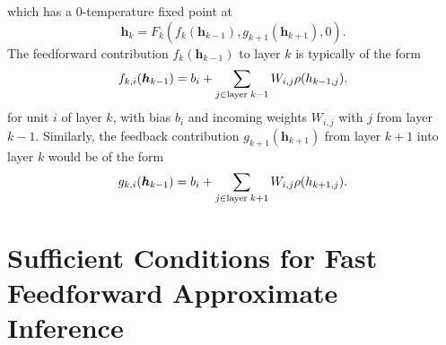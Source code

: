 \documentclass{article}
\newcommand   \vh{{\bm h}}
\begin{document}
which has a 0-temperature fixed point at
\begin{equation}
 \vh_k = F_k(f_k(\vh_{k-1}),g_{k+1}(\vh_{k+1}),0).
\end{equation}
The feedforward contribution $f_k(\vh_{k-1})$ to layer $k$ is typically of the form
\begin{equation}
   f_{k,i}(\vh_{k-1}) = b_i + \sum_{j \in {\rm layer}\; k-1} W_{i,j} \rho(h_{k-1,j}).
\end{equation}
for unit $i$ of layer $k$, with bias $b_i$ and incoming weights $W_{i,j}$ with $j$ from layer $k-1$.
Similarly, the feedback contribution $g_{k+1}(\vh_{k+1})$ from layer $k+1$ into layer $k$ would
be of the form
\begin{equation}
   g_{k,i}(\vh_{k-1}) = b_i + \sum_{j \in {\rm layer}\; k+1} W_{i,j} \rho(h_{k+1,j}).
\end{equation}


\section{Sufficient Conditions for Fast Feedforward Approximate Inference}
\end{document}

